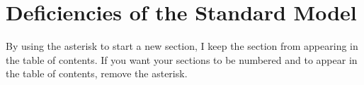 \section{Deficiencies of the Standard Model}

By using the asterisk to start a new section, I keep the section from appearing in the table of contents.
If you want your sections to be numbered and to appear in the table of contents, remove the asterisk.











